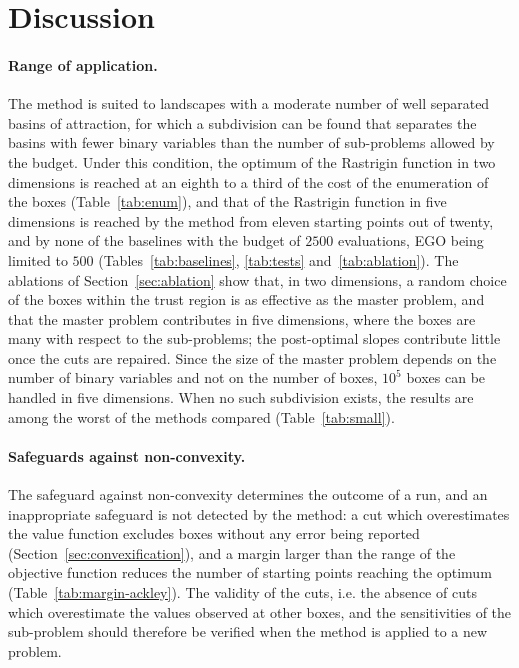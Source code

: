 \documentclass[pdflatex,sn-basic]{sn-jnl}
\begin{document}
\section{Discussion}\label{sec:discussion}

\paragraph{Range of application.} The method is suited to landscapes with a
moderate number of well separated basins of attraction, for which a subdivision
can be found that separates the basins with fewer binary variables than the
number of sub-problems allowed by the budget. Under this condition, the optimum
of the Rastrigin function in two dimensions is reached at an eighth to a third
of the cost of the enumeration of the boxes (Table~\ref{tab:enum}), and that of
the Rastrigin function in five dimensions is reached by the method from eleven
starting points out of twenty, and by none of the baselines with the budget of
$2500$ evaluations, EGO being limited to $500$ (Tables~\ref{tab:baselines},
\ref{tab:tests} and~\ref{tab:ablation}). The ablations of
Section~\ref{sec:ablation} show that, in two dimensions, a random choice of the
boxes within the trust region is as effective as the master problem, and that
the master problem contributes in five dimensions, where the boxes are many with
respect to the sub-problems; the post-optimal slopes contribute little once the
cuts are repaired. Since the size of the master
problem depends on the number of binary variables and not on the number of
boxes, $10^5$ boxes can be handled in five dimensions. When no such subdivision
exists, the results are among the worst of the methods compared
(Table~\ref{tab:small}).

\paragraph{Safeguards against non-convexity.} The safeguard against
non-convexity determines the outcome of a run, and an inappropriate safeguard is
not detected by the method: a cut which overestimates the value function excludes
boxes without any error being reported (Section~\ref{sec:convexification}), and
a margin larger than the range of the objective function reduces the number of
starting points reaching the optimum (Table~\ref{tab:margin-ackley}). The
validity of the cuts, i.e. the absence of cuts which
overestimate the values observed at other boxes, and the sensitivities of the
sub-problem should therefore be verified when the method is applied to a new
problem.
\end{document}
